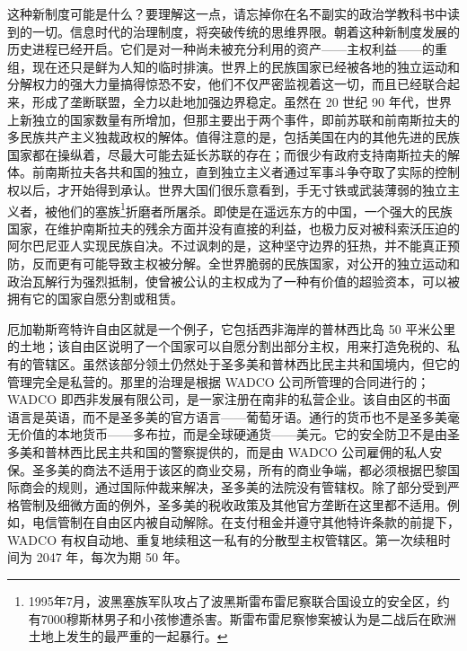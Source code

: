 这种新制度可能是什么？要理解这一点，请忘掉你在名不副实的政治学教科书中读到的一切。信息时代的治理制度，将突破传统的思维界限。朝着这种新制度发展的历史进程已经开启。它们是对一种尚未被充分利用的资产——主权利益——的重组，现在还只是鲜为人知的临时排演。世界上的民族国家已经被各地的独立运动和分解权力的强大力量搞得惊恐不安，他们不仅严密监视着这一切，而且已经联合起来，形成了垄断联盟，全力以赴地加强边界稳定。虽然在 20 世纪 90 年代，世界上新独立的国家数量有所增加，但那主要出于两个事件，即前苏联和前南斯拉夫的多民族共产主义独裁政权的解体。值得注意的是，包括美国在内的其他先进的民族国家都在操纵着，尽最大可能去延长苏联的存在；而很少有政府支持南斯拉夫的解体。前南斯拉夫各共和国的独立，直到独立主义者通过军事斗争夺取了实际的控制权以后，才开始得到承认。世界大国们很乐意看到，手无寸铁或武装薄弱的独立主义者，被他们的塞族\footnote{1995年7月，波黑塞族军队攻占了波黑斯雷布雷尼察联合国设立的安全区，约有7000穆斯林男子和小孩惨遭杀害。斯雷布雷尼察惨案被认为是二战后在欧洲土地上发生的最严重的一起暴行。}折磨者所屠杀。即使是在遥远东方的中国，一个强大的民族国家，在维护南斯拉夫的残余方面并没有直接的利益，也极力反对被科索沃压迫的阿尔巴尼亚人实现民族自决。不过讽刺的是，这种坚守边界的狂热，并不能真正预防，反而更有可能导致主权被分解。全世界脆弱的民族国家，对公开的独立运动和政治瓦解行为强烈抵制，使曾被公认的主权成为了一种有价值的超验资本，可以被拥有它的国家自愿分割或租赁。

厄加勒斯弯特许自由区就是一个例子，它包括西非海岸的普林西比岛 50 平米公里的土地；该自由区说明了一个国家可以自愿分割出部分主权，用来打造免税的、私有的管辖区。虽然该部分领土仍然处于圣多美和普林西比民主共和国境内，但它的管理完全是私营的。那里的治理是根据 WADCO 公司所管理的合同进行的；WADCO 即西非发展有限公司，是一家注册在南非的私营企业。该自由区的书面语言是英语，而不是圣多美的官方语言——葡萄牙语。通行的货币也不是圣多美毫无价值的本地货币——多布拉，而是全球硬通货——美元。它的安全防卫不是由圣多美和普林西比民主共和国的警察提供的，而是由 WADCO 公司雇佣的私人安保。圣多美的商法不适用于该区的商业交易，所有的商业争端，都必须根据巴黎国际商会的规则，通过国际仲裁来解决，圣多美的法院没有管辖权。除了部分受到严格管制及细微方面的例外，圣多美的税收政策及其他官方垄断在这里都不适用。例如，电信管制在自由区内被自动解除。在支付租金并遵守其他特许条款的前提下，WADCO 有权自动地、重复地续租这一私有的分散型主权管辖区。第一次续租时间为 2047 年，每次为期 50 年。

